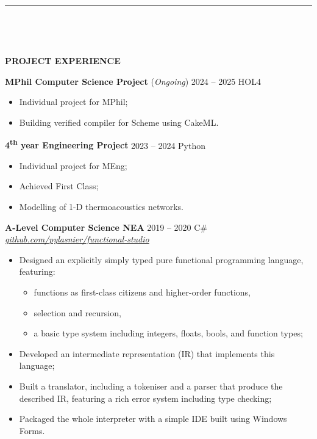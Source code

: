 \documentclass[
  11pt,
  a4paper,
]{article}
\providecommand{\tightlist}{%
  \setlength{\itemsep}{0pt}\setlength{\parskip}{0pt}}
\newcommand{\itemspace}{0.8ex}
\newcommand{\ruledheader}[2]{%
\begingroup
\setlength{\fboxsep}{0pt}%
\colorbox{#1}{%
\parbox[b][1.2ex][t]{35mm}{\begin{tiny}\ \end{tiny}}}%
\parbox[b][1.2ex][t]{5mm}{\begin{tiny}\ \end{tiny}}%
\uppercase{\textbf{#2}}
\endgroup}
\begin{document}
\begin{Large}

\vspace{-1.5ex}\rule{\textwidth}{0.8pt}\vspace{2ex}

\ruledheader{cyan!50!teal}{Project experience}\end{Large}

\vspace{\itemspace}

\textbf{MPhil Computer Science Project} (\emph{Ongoing}) \textbar{} 2024
– 2025 \textbar{} HOL4

\begin{itemize}
\tightlist
\item
  Individual project for MPhil;
\item
  Building verified compiler for Scheme using CakeML.
\end{itemize}

\vspace{\itemspace}

\textbf{4\textsuperscript{th} year Engineering Project} \textbar{} 2023
– 2024 \textbar{} Python

\begin{itemize}
\tightlist
\item
  Individual project for MEng;
\item
  Achieved First Class;
\item
  Modelling of 1-D thermoacoustics networks.
\end{itemize}

\vspace{\itemspace}

\textbf{A-Level Computer Science NEA} \textbar{} 2019 – 2020 \textbar{}
C\# \textbar{}
\href{https://github.com/pylasnier/functional-studio}{\emph{github.com/pylasnier/functional-studio}}

\begin{itemize}
\tightlist
\item
  Designed an explicitly simply typed pure functional programming
  language, featuring:

  \begin{itemize}
  \tightlist
  \item
    functions as first-class citizens and higher-order functions,
  \item
    selection and recursion,
  \item
    a basic type system including integers, floats, bools, and function
    types;
  \end{itemize}
\item
  Developed an intermediate representation (IR) that implements this
  language;
\item
  Built a translator, including a tokeniser and a parser that produce
  the described IR, featuring a rich error system including type
  checking;
\item
  Packaged the whole interpreter with a simple IDE built using Windows
  Forms.
\end{itemize}
\end{document}
